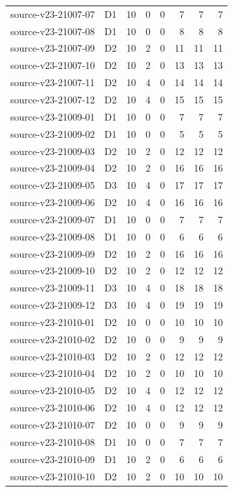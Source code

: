 \begin{longtable}{p{}lrrrrrr}
source-v23-21007-07 & D1 & 10 & 0 & 0 & 7 & 7 & 7\\
source-v23-21007-08 & D1 & 10 & 0 & 0 & 8 & 8 & 8\\
source-v23-21007-09 & D2 & 10 & 2 & 0 & 11 & 11 & 11\\
source-v23-21007-10 & D2 & 10 & 2 & 0 & 13 & 13 & 13\\
source-v23-21007-11 & D2 & 10 & 4 & 0 & 14 & 14 & 14\\
source-v23-21007-12 & D2 & 10 & 4 & 0 & 15 & 15 & 15\\
source-v23-21009-01 & D1 & 10 & 0 & 0 & 7 & 7 & 7\\
source-v23-21009-02 & D1 & 10 & 0 & 0 & 5 & 5 & 5\\
source-v23-21009-03 & D2 & 10 & 2 & 0 & 12 & 12 & 12\\
source-v23-21009-04 & D2 & 10 & 2 & 0 & 16 & 16 & 16\\
source-v23-21009-05 & D3 & 10 & 4 & 0 & 17 & 17 & 17\\
source-v23-21009-06 & D2 & 10 & 4 & 0 & 16 & 16 & 16\\
source-v23-21009-07 & D1 & 10 & 0 & 0 & 7 & 7 & 7\\
source-v23-21009-08 & D1 & 10 & 0 & 0 & 6 & 6 & 6\\
source-v23-21009-09 & D2 & 10 & 2 & 0 & 16 & 16 & 16\\
source-v23-21009-10 & D2 & 10 & 2 & 0 & 12 & 12 & 12\\
source-v23-21009-11 & D3 & 10 & 4 & 0 & 18 & 18 & 18\\
source-v23-21009-12 & D3 & 10 & 4 & 0 & 19 & 19 & 19\\
source-v23-21010-01 & D2 & 10 & 0 & 0 & 10 & 10 & 10\\
source-v23-21010-02 & D2 & 10 & 0 & 0 & 9 & 9 & 9\\
source-v23-21010-03 & D2 & 10 & 2 & 0 & 12 & 12 & 12\\
source-v23-21010-04 & D2 & 10 & 2 & 0 & 10 & 10 & 10\\
source-v23-21010-05 & D2 & 10 & 4 & 0 & 12 & 12 & 12\\
source-v23-21010-06 & D2 & 10 & 4 & 0 & 12 & 12 & 12\\
source-v23-21010-07 & D2 & 10 & 0 & 0 & 9 & 9 & 9\\
source-v23-21010-08 & D1 & 10 & 0 & 0 & 7 & 7 & 7\\
source-v23-21010-09 & D1 & 10 & 2 & 0 & 6 & 6 & 6\\
source-v23-21010-10 & D2 & 10 & 2 & 0 & 10 & 10 & 10\\

\end{longtable}

